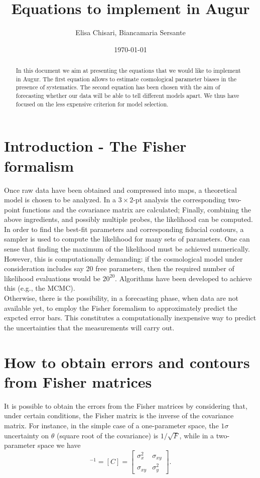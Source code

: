 \documentclass[modern]{lsstdescnote}
\begin{document}
\title{Equations to implement in Augur}
\author{Elisa Chisari, Biancamaria Sersante}
\date{\today}

\begin{abstract}
In this document we aim at presenting the equations that we would like to implement in Augur. 
The first equation allows to estimate cosmological parameter biases in the presence of systematics.
The second equation has been chosen with the aim of forecasting whether our data will be able to tell different models apart.
We thus have focused on the less expensive criterion for model selection.
\end{abstract}

\maketitle

\section{Introduction - The Fisher formalism}
Once raw data have been obtained and compressed into maps, a theoretical model is chosen 
to be analyzed. In a $3\times 2$-pt analysis the corresponding two-point functions and the covariance matrix are calculated;
Finally, combining the above ingredients, and possibly multiple probes, the likelihood can be computed.
In order to find the best-fit parameters and corresponding fiducial contours, a sampler is used to compute the likelihood 
for many sets of parameters. One can sense that finding the maximum of the likelihood must be achieved numerically.
However, this is computationally demanding: if the cosmological model under consideration includes say 20 free parameters,
then the required number of likelihood evaluations would be $20^{20}$. Algorithms have been developed to achieve this (e.g., the MCMC).\\
Otherwise, there is the possibility, in a forecasting phase, when data are not available yet, to employ the Fisher 
foremalism to approximately predict the expcted error bars. This constitutes a computationally inexpensive way
to predict the uncertainties that the measurements will carry out.

\section{How to obtain errors and contours from Fisher matrices}
It is possible to obtain the errors from the Fisher matrices by considering that, under certain conditions,
the Fisher matrix is the inverse of the covariance matrix.
For instance, in the simple case of a one-parameter space, the $1\sigma$ uncertainty on $\theta$ (square root of the covariance) is $1/\sqrt{F}$, while in a two-parameter space we have 
\begin{equation}
[F]^{-1}=[C]=\left[\begin{array}{cc}
\sigma_{x}^{2} & \sigma_{x y} \\
\sigma_{x y} & \sigma_{y}^{2}
\end{array}\right].
\end{equation}
\end{document}
